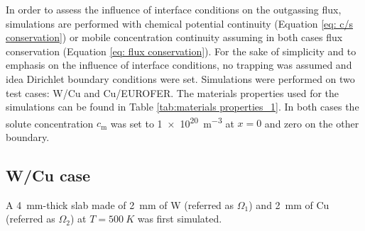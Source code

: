 In order to assess the influence of interface conditions on the outgassing flux, simulations are performed with chemical potential continuity (Equation \ref{eq: c/s conservation}) or mobile concentration continuity assuming in both cases flux conservation (Equation \ref{eq: flux conservation}).
For the sake of simplicity and to emphasis on the influence of interface conditions, no trapping was assumed and idea Dirichlet boundary conditions were set.
Simulations were performed on two test cases: W/Cu and Cu/EUROFER.
The materials properties used for the simulations can be found in Table \ref{tab:materials properties_1}.
In both cases the solute concentration $c_\mathrm{m}$ was set to \SI{1e20}{m^{-3}} at $x=0$ and zero on the other boundary.

\subsection{W/Cu case}
A \SI{4}{mm}-thick slab made of \SI{2}{mm} of W (referred as $\Omega_1$) and \SI{2}{mm} of Cu (referred as $\Omega_2$)  at $T=\SI{500}{K}$ was first simulated.



